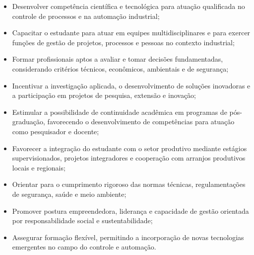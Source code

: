 \begin{itemize}
	\item Desenvolver competência científica e tecnológica para atuação qualificada no controle de processos e na automação industrial;
	\item Capacitar o estudante para atuar em equipes multidisciplinares e para exercer funções de gestão de projetos, processos e pessoas no contexto industrial;
	\item Formar profissionais aptos a avaliar e tomar decisões fundamentadas, considerando critérios técnicos, econômicos, ambientais e de segurança;
	\item Incentivar a investigação aplicada, o desenvolvimento de soluções inovadoras e a participação em projetos de pesquisa, extensão e inovação;
	\item Estimular a possibilidade de continuidade acadêmica em programas de pós-graduação, favorecendo o desenvolvimento de competências para atuação como pesquisador e docente;
	\item Favorecer a integração do estudante com o setor produtivo mediante estágios supervisionados, projetos integradores e cooperação com arranjos produtivos locais e regionais;
	\item Orientar para o cumprimento rigoroso das normas técnicas, regulamentações de segurança, saúde e meio ambiente;
	\item Promover postura empreendedora, liderança e capacidade de gestão orientada por responsabilidade social e sustentabilidade;
	\item Assegurar formação flexível, permitindo a incorporação de novas tecnologias emergentes no campo do controle e automação.
\end{itemize}
